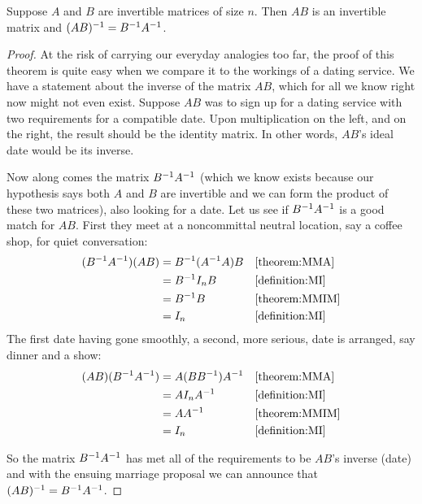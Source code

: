 \documentclass{ximera}
\begin{document}
\begin{theorem}
\label{theorem:SS}

Suppose $A$ and $B$ are invertible matrices of size $n$.  Then $AB$ is
an invertible matrix and $(AB)^{-1}=B^{-1}A^{-1}$.

\begin{proof}
  At the risk of carrying our everyday analogies too far, the proof of
  this theorem is quite easy when we compare it to the workings of a
  dating service.  We have a statement about the inverse of the matrix
  $AB$, which for all we know right now might not even exist.  Suppose
  $AB$ was to sign up for a dating service with two requirements for a
  compatible date.  Upon multiplication on the left, and on the right,
  the result should be the identity matrix.  In other words, $AB$'s
  ideal date would be its inverse.

  Now along comes the matrix $B^{-1}A^{-1}$ (which we know
  exists because our hypothesis says both $A$ and $B$ are invertible
  and we can form the product of these two matrices), also looking for
  a date.  Let us see if $B^{-1}A^{-1}$ is a good match for
  $AB$.  First they meet at a noncommittal neutral location, say a
  coffee shop, for quiet conversation:
  \begin{align*}
    (B^{-1}A^{-1})(AB)
    &=B^{-1}(A^{-1}A)B&&\ref{theorem:MMA}\\
    &=B^{-1}I_nB&&\ref{definition:MI}\\
    &=B^{-1}B&&\ref{theorem:MMIM}\\
    &=I_n&&\ref{definition:MI}
  \end{align*}
  The first date having gone smoothly, a second, more serious, date is arranged, say dinner and a show:
  \begin{align*}
    (AB)(B^{-1}A^{-1})
    &=A(BB^{-1})A^{-1}&&\ref{theorem:MMA}\\
    &=AI_nA^{-1}&&\ref{definition:MI}\\
    &=AA^{-1}&&\ref{theorem:MMIM}\\
    &=I_n&&\ref{definition:MI}
  \end{align*}

  So the matrix $B^{-1}A^{-1}$ has met all of the
  requirements to be $AB$'s inverse (date) and with the ensuing
  marriage proposal we can announce that
  $(AB)^{-1}=B^{-1}A^{-1}$.
\end{proof}
\end{theorem}
\end{document}

